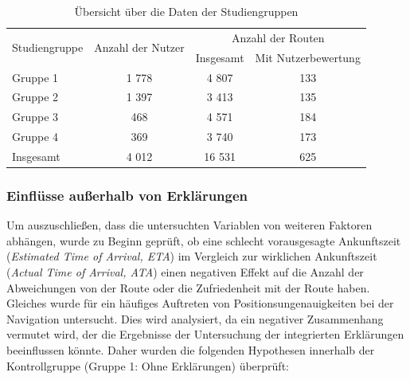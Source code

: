 \begin{table}[htb!]
    \centering
    \begin{tabular}{p{} c c c}
        \hline
        \multirow{2}{*}{Studiengruppe} & \multirow{2}{*}{Anzahl der Nutzer} & \multicolumn{2}{c}{Anzahl der Routen} \\
        & & Insgesamt & Mit Nutzerbewertung \\
        \toprule
        Gruppe 1            & 1 778 & 4 807  & 133 \\
        Gruppe 2            & 1 397 & 3 413  & 135 \\
        Gruppe 3            & 468   & 4 571  & 184 \\
        Gruppe 4            & 369   & 3 740  & 173 \\
        \midrule
        Insgesamt           & 4 012 & 16 531 & 625 \\ 
        \toprule
    \end{tabular}
    \caption{Übersicht über die Daten der Studiengruppen}
    \label{tab:study_user_group_overview}
\end{table}

\subsubsection{Einflüsse außerhalb von Erklärungen}
\label{sec:evaluation_other_dependencies}

Um auszuschließen, dass die untersuchten Variablen von weiteren Faktoren abhängen, wurde zu Beginn geprüft, ob eine schlecht vorausgesagte Ankunftszeit (\textit{Estimated Time of Arrival, ETA}) im Vergleich zur wirklichen Ankunftszeit (\textit{Actual Time of Arrival, ATA}) einen negativen Effekt auf die Anzahl der Abweichungen von der Route oder die Zufriedenheit mit der Route haben. Gleiches wurde für ein häufiges Auftreten von Positionsungenauigkeiten bei der Navigation untersucht. Dies wird analysiert, da ein negativer Zusammenhang vermutet wird, der die Ergebnisse der Untersuchung der integrierten Erklärungen beeinflussen könnte. Daher wurden die folgenden Hypothesen innerhalb der Kontrollgruppe (Gruppe 1: Ohne Erklärungen) überprüft:

